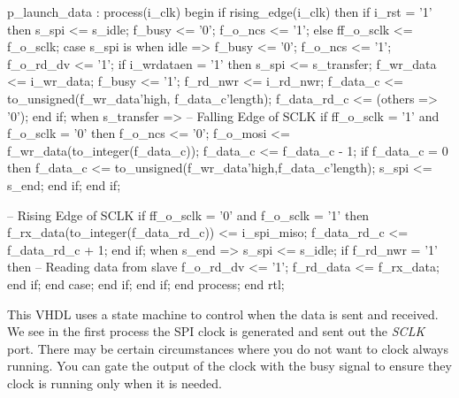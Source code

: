 \begin{VHDLlisting}[tabsize=4]
    p_launch_data : process(i_clk)
    begin
        if rising_edge(i_clk) then
            if i_rst = '1' then
                s_spi <= s_idle;
                f_busy <= '0';
                f_o_ncs <= '1';
            else
                ff_o_sclk <= f_o_sclk;
                case s_spi is
                    when idle =>
                        f_busy <= '0';
                        f_o_ncs <= '1';
                        f_o_rd_dv <= '1';
                        if i_wrdataen = '1' then
                            s_spi <= s_transfer;
                            f_wr_data <= i_wr_data;
                            f_busy <= '1';
                            f_rd_nwr <= i_rd_nwr;
                            f_data_c <= to_unsigned(f_wr_data'high,
                                        f_data_c'length);
                            f_data_rd_c <= (others => '0');
                        end if;
                    when s_transfer => 
                        -- Falling Edge of SCLK
                        if ff_o_sclk = '1' and f_o_sclk = '0' then
                            f_o_ncs <= '0';
                            f_o_mosi <= f_wr_data(to_integer(f_data_c));
                            f_data_c <= f_data_c - 1;
                            if f_data_c = 0 then
                                f_data_c <= 
                                to_unsigned(f_wr_data'high,f_data_c'length);
                                s_spi <= s_end;
                            end if;
                        end if;					

                        -- Rising Edge of SCLK
                        if ff_o_sclk = '0' and f_o_sclk = '1' then
                            f_rx_data(to_integer(f_data_rd_c)) <= i_spi_miso;
                            f_data_rd_c <= f_data_rd_c + 1;
                        end if;
                    when s_end => 
                        s_spi <= s_idle;
                        if f_rd_nwr = '1' then
                            -- Reading data from slave
                            f_o_rd_dv <= '1';
                            f_rd_data <= f_rx_data;
                        end if;				
                end case;
            end if;
        end if;	
    end process;
end rtl;
\end{VHDLlisting}

This \ac{VHDL} uses a state machine to control when the data is sent and received. We see in the first process the \ac{SPI} clock is generated and sent out the \emph{SCLK} port. There may be certain circumstances where you do not want to clock always running. You can gate the output of the clock with the busy signal to ensure they clock is running only when it is needed. 


